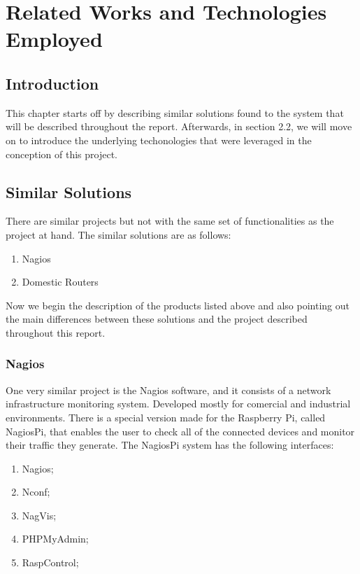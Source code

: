 \chapter{Related Works and Technologies Employed}
\label{chap:related-material}

\section{Introduction}
\label{chap2:sec:intro}
This chapter starts off by describing similar solutions found to the system that
will be described throughout the report. Afterwards, in section 2.2, we will
move on to introduce the underlying techonologies that were leveraged in the
conception of this project.

\section{Similar Solutions}
\label{chap2:sec:similar-sol}
There are similar projects but not with the same set of functionalities as the
project at hand. The similar solutions are as follows:
\begin{enumerate}
	\item Nagios
	\item Domestic Routers
\end{enumerate}

Now we begin the description of the products listed above and also pointing out
the main differences between these solutions and the project described
throughout this report.

\subsection{Nagios}
\label{chap2:sec:similar-sol:sub:nagios}
One very similar project is the Nagios software, and it consists of a network
infrastructure monitoring system. Developed mostly for comercial and industrial
environments. There is a special version made for the Raspberry Pi, called
NagiosPi, that enables the user to check all of the connected devices and
monitor their traffic they generate. The NagiosPi system has the following
interfaces:
\begin{enumerate}
	\item Nagios;
	\item Nconf;
	\item NagVis;
	\item PHPMyAdmin;
	\item RaspControl;
\end{enumerate}

